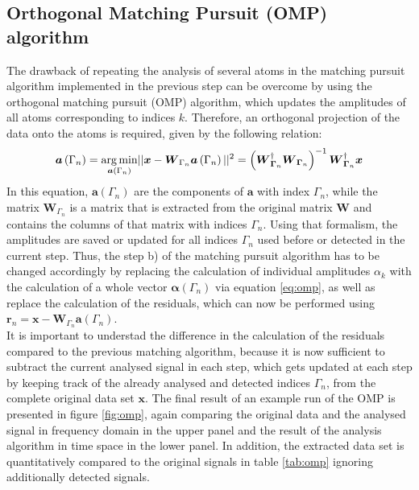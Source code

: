 \subsection{Orthogonal Matching Pursuit (OMP) algorithm}
The drawback of repeating the analysis of several atoms in the matching pursuit algorithm implemented in the previous step can be overcome by using the orthogonal matching pursuit (OMP) algorithm, which updates the amplitudes of all atoms corresponding to indices $k$. Therefore, an orthogonal projection of the data onto the atoms is required, given by the following relation: 
\begin{equation}
\boldsymbol{a}\left(\Gamma_{n}\right)= \underset{\boldsymbol{a}\left(\Gamma_{n}\right)}{\operatorname*{arg\,min}} || \boldsymbol{x}- \boldsymbol{W}_{\Gamma_{n}}\boldsymbol{a}\left(\Gamma_{n}\right) ||^{2}=\left(\boldsymbol{W}_{\boldsymbol{\Gamma}_{n}}^{\dag}\boldsymbol{W}_{\boldsymbol{\Gamma}_{n}}\right)^{-1}\boldsymbol{W}_{\boldsymbol{\Gamma}_{n}}^{\dag}\boldsymbol{x}
\label{eq:omp}
\end{equation}
In this equation, $\boldsymbol{a}\left(\Gamma_{n} \right)$ are the components of $\boldsymbol{a}$  with index $\Gamma_{n}$, while the matrix $\boldsymbol{W}_{\Gamma_{n}}$ is a matrix that is extracted from the original matrix $\boldsymbol{W}$ and contains the columns of that matrix with indices $\Gamma_{n}$.  Using that formalism, the amplitudes are saved or updated for all indices $\Gamma_{n}$ used before or detected in the current step. Thus, the step b) of the matching pursuit algorithm has to be changed accordingly by replacing the calculation of individual amplitudes $\alpha_{k}$ with the calculation of a whole vector $\boldsymbol{\alpha}\left(\Gamma_{n}\right)$ via equation \ref{eq:omp}, as well as replace the calculation of the residuals, which can now be performed using $\boldsymbol{r}_{n}=\boldsymbol{x}-\boldsymbol{W}_{\Gamma_{n}}\boldsymbol{a}\left(\Gamma_{n}\right)$. \\
It is important to understad the difference in the calculation of the residuals compared to the previous matching algorithm, because it is now sufficient to subtract the current analysed signal in each step, which gets updated at each step by keeping track of the already analysed and detected indices $\Gamma_{n}$,  from the complete original data set $\boldsymbol{x}$. The final result of an example run of the OMP is presented in figure \ref{fig:omp}, again comparing the original data and the analysed signal in frequency domain in the upper panel and the result of the analysis algorithm in time space in the lower panel. In addition, the extracted data set is quantitatively compared to the original signals in table \ref{tab:omp} ignoring additionally detected signals.

